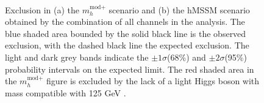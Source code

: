 \begin{figure}[h!]
\begin{center}
~\\
\end{center}
\caption[Exclusion in the $m_{h}^{\text{mod+}}$ scenario and the hMSSM
scenario of the \AHtotautau analysis.]{Exclusion in (a) the $m_{h}^{\text{mod}+}$ scenario and (b) the hMSSM scenario 
obtained by the combination
of all channels in the \AHtotautau analysis. The blue shaded area bounded by the 
solid black line is the observed exclusion, with the dashed black line the
expected exclusion. The light and dark grey bands indicate
the $\pm 1\sigma$(68\%) and $\pm 2\sigma$(95\%) probability intervals on the expected limit.
The red shaded area in the $m_{h}^{\text{mod}+}$ figure
is excluded by the lack of a light Higgs boson with mass compatible with 125 GeV \cite{CMS-PAS-HIG-16-037}.}
\label{fig:mssm_mhmodp_2016}
\end{figure}

